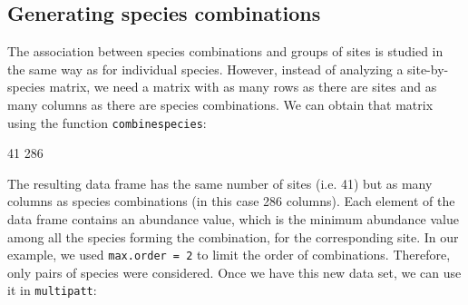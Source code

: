 \documentclass[11pt,a4paper]{article}
\begin{document}
\subsection{Generating species combinations}
The association between species combinations and groups of sites is studied in the same way as for individual species. However, instead of analyzing a site-by-species matrix, we need a matrix with as many rows as there are sites and as many columns as there are species combinations. We can obtain that matrix using the function \texttt{combinespecies}:
\begin{Schunk}
\begin{Soutput}
[1]  41 286
\end{Soutput}
\end{Schunk}
The resulting data frame has the same number of sites (i.e. 41) but as many columns as species combinations (in this case 286 columns). Each element of the data frame contains an abundance value, which is the minimum abundance value among all the species forming the combination, for the corresponding site. In our example, we used \texttt{max.order = 2} to limit the order of combinations. Therefore, only pairs of species were considered. Once we have this new data set, we can use it in \texttt{multipatt}:
\end{document}
